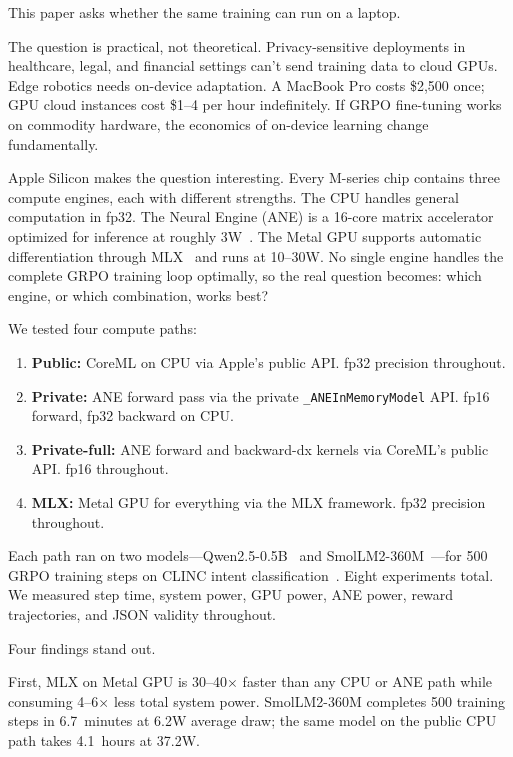 \documentclass[11pt]{article}
\begin{document}
This paper asks whether the same training can run on a laptop.

The question is practical, not theoretical.  Privacy-sensitive deployments in healthcare, legal, and financial settings can't send training data to cloud GPUs.  Edge robotics needs on-device adaptation.  A MacBook Pro costs \$2,500 once; GPU cloud instances cost \$1--4 per hour indefinitely.  If GRPO fine-tuning works on commodity hardware, the economics of on-device learning change fundamentally.

Apple Silicon makes the question interesting.  Every M-series chip contains three compute engines, each with different strengths.  The CPU handles general computation in fp32.  The Neural Engine (ANE) is a 16-core matrix accelerator optimized for inference at roughly 3W~\cite{apple2022m2max}.  The Metal GPU supports automatic differentiation through MLX~\cite{hannun2023mlx} and runs at 10--30W.  No single engine handles the complete GRPO training loop optimally, so the real question becomes: which engine, or which combination, works best?

We tested four compute paths:

\begin{enumerate}[leftmargin=*]
\item \textbf{Public:} CoreML on CPU via Apple's public API.  fp32 precision throughout.
\item \textbf{Private:} ANE forward pass via the private \texttt{\_ANEInMemoryModel} API.  fp16 forward, fp32 backward on CPU.
\item \textbf{Private-full:} ANE forward and backward-dx kernels via CoreML's public API.  fp16 throughout.
\item \textbf{MLX:} Metal GPU for everything via the MLX framework.  fp32 precision throughout.
\end{enumerate}

Each path ran on two models---Qwen2.5-0.5B~\cite{qwen2025qwen25} and SmolLM2-360M~\cite{allal2024smollm2}---for 500 GRPO training steps on CLINC intent classification~\cite{larson2019clinc150}.  Eight experiments total.  We measured step time, system power, GPU power, ANE power, reward trajectories, and JSON validity throughout.

Four findings stand out.

First, MLX on Metal GPU is 30--40$\times$ faster than any CPU or ANE path while consuming 4--6$\times$ less total system power.  SmolLM2-360M completes 500 training steps in 6.7~minutes at 6.2W average draw; the same model on the public CPU path takes 4.1~hours at 37.2W.
\end{document}
